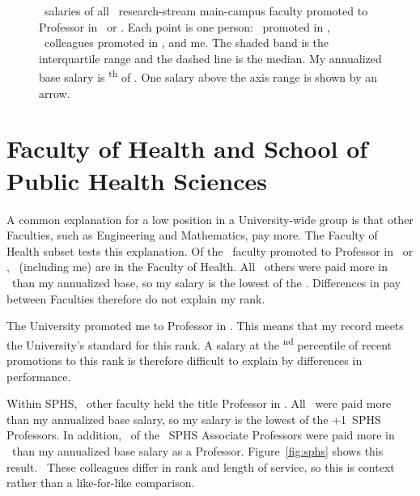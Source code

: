 \documentclass{article}
\newcommand{\AxisMax}{260000}
\newif\ifUnitComparisons
\begin{document}
\begin{figure}[H]
    \caption{\PoolYear\ salaries of all \PoolN\ research-stream main-campus faculty promoted to Professor in \PoolPrevYear\ or \PoolYear. Each point is one person: \PoolNEarlierKept\ promoted in \PoolPrevYear, \the\numexpr{}\relax\ colleagues promoted in \PoolYear, and me. The shaded band is the interquartile range and the dashed line is the median. My annualized base salary is \SubjectRank\textsuperscript{th} of \PoolN. One salary above the axis range is shown by an arrow.}
    \label{fig:pool}
\end{figure}


\ifUnitComparisons
\section*{Faculty of Health and School of Public Health Sciences}

A common explanation for a low position in a University-wide group is that other Faculties, such as Engineering and Mathematics, pay more. The Faculty of Health subset tests this explanation. Of the \PoolN\ faculty promoted to Professor in \PoolPrevYear\ or \PoolYear, \HealthN\ (including me) are in the Faculty of Health. All \HealthNAbove\ others were paid more in \PoolYear\ than my annualized base, so my salary is the lowest of the \HealthN. Differences in pay between Faculties therefore do not explain my rank.

The University promoted me to Professor in \PoolYear. This means that my record meets the University's standard for this rank. A salary at the \SubjectPercentile\textsuperscript{nd} percentile of recent promotions to this rank is therefore difficult to explain by differences in performance.

Within SPHS, \SphsNProf\ other faculty held the title Professor in \PoolYear. All \SphsNProfAbove\ were paid more than my annualized base salary, so my salary is the lowest of the \the\numexpr\SphsNProf+1\relax\ SPHS Professors. In addition, \SphsNAssocAbove\ of the \SphsNAssoc\ SPHS Associate Professors were paid more in \PoolYear\ than my annualized base salary as a Professor. Figure~\ref{fig:sphs} shows this result. \SphsRequestSentence\ These colleagues differ in rank and length of service, so this is context rather than a like-for-like comparison.
\end{document}
